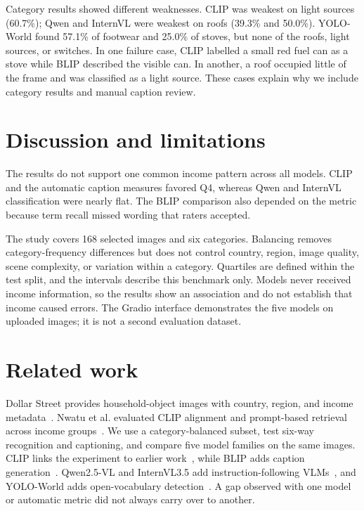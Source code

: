 \documentclass[10pt,twocolumn,letterpaper]{article}
\begin{document}
Category results showed different weaknesses. CLIP was weakest on light sources (60.7\%); Qwen and InternVL were weakest on roofs (39.3\% and 50.0\%). YOLO-World found 57.1\% of footwear and 25.0\% of stoves, but none of the roofs, light sources, or switches. In one failure case, CLIP labelled a small red fuel can as a stove while BLIP described the visible can. In another, a roof occupied little of the frame and was classified as a light source. These cases explain why we include category results and manual caption review.

\section{Discussion and limitations}
The results do not support one common income pattern across all models. CLIP and the automatic caption measures favored Q4, whereas Qwen and InternVL classification were nearly flat. The BLIP comparison also depended on the metric because term recall missed wording that raters accepted.

The study covers 168 selected images and six categories. Balancing removes category-frequency differences but does not control country, region, image quality, scene complexity, or variation within a category. Quartiles are defined within the test split, and the intervals describe this benchmark only. Models never received income information, so the results show an association and do not establish that income caused errors. The Gradio interface demonstrates the five models on uploaded images; it is not a second evaluation dataset.

\section{Related work}
Dollar Street provides household-object images with country, region, and income metadata~\cite{rojas2022}. Nwatu et al. evaluated CLIP alignment and prompt-based retrieval across income groups~\cite{nwatu2023}. We use a category-balanced subset, test six-way recognition and captioning, and compare five model families on the same images. CLIP links the experiment to earlier work~\cite{radford2021}, while BLIP adds caption generation~\cite{li2022}. Qwen2.5-VL and InternVL3.5 add instruction-following VLMs~\cite{bai2025,wang2025}, and YOLO-World adds open-vocabulary detection~\cite{cheng2024}. A gap observed with one model or automatic metric did not always carry over to another.

{\small


}
\end{document}
